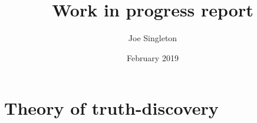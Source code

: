 \documentclass{article}
\date{February 2019}
\author{Joe Singleton}
\title{
    Work in progress report
}
\theoremstyle{definition} \newtheorem{definition}{Definition}
\theoremstyle{definition} \newtheorem{example}{Example}
\theoremstyle{plain} \newtheorem{axiom}{Axiom}
\theoremstyle{plain} \newtheorem*{remark}{Remark}
\theoremstyle{remark} \newtheorem*{notation}{Notation}
\theoremstyle{plain} \newtheorem{lemma}{Lemma}
\theoremstyle{plain} \newtheorem{theorem}{Theorem}
\theoremstyle{plain} \newtheorem{proposition}{Proposition}
\begin{document}
\maketitle

\tableofcontents



\section{Theory of truth-discovery}


{}


\appendix


\end{document}
